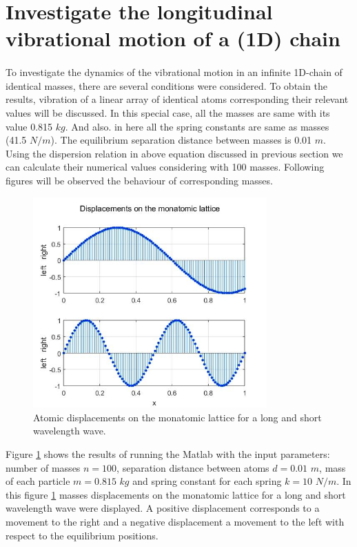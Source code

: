 \newpage

\section{Investigate the longitudinal vibrational motion of a (1D) chain}
\paragraph{}
To investigate the dynamics of the vibrational motion in an infinite 1D-chain of identical masses, there are several conditions were considered. To obtain the results, vibration of a linear array of identical atoms corresponding their relevant values will be discussed. In this special case, all the masses are same with its value 0.815 $kg$. And also. in here all the spring constants are same as masses (41.5 $N/m$). The equilibrium separation distance between masses is 0.01 $m$. Using the dispersion relation in above equation discussed in previous section we can calculate their numerical values considering with 100 masses. Following figures will be observed the behaviour of corresponding masses. 


  \begin{figure}[hbt!]
	\centering
	\begin{framed}
	\includegraphics[width=0.8\textwidth]{Figures/N1.jpg}
		\end{framed}
	\caption{ Atomic displacements on the monatomic lattice for a long and short wavelength wave. }
	\label{fig:Lat1}
\end{figure}

Figure \ref{fig:Lat1} shows the results of running the Matlab  with the input parameters: number of masses $n = 100$, separation distance between atoms $d = 0.01$ $m$, mass of each particle $m = 0.815$ $kg$ and spring constant for each spring $k = 10$ $N/m$. In this figure \ref{fig:Lat1} masses displacements on the monatomic lattice for a long and short wavelength wave were displayed. A positive displacement corresponds to a movement to the right and a negative displacement a movement to the left with respect to the equilibrium positions. 

